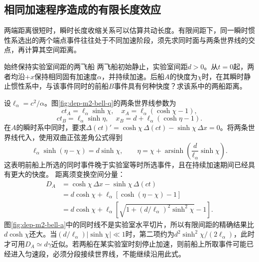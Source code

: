 \subsection{相同加速程序造成的有限长度效应}
两端距离很短时，瞬时长度收缩关系可以估算共动长度。有限间距下，同一瞬时惯性系选出的两个端点事件往往处于不同加速阶段，须先求同时面与两条世界线的交点，再计算其空间距离。

\begin{example}始终保持实验室间距的两飞船
两飞船初始静止，实验室间距$d>0$。从$t=0$起，两者均沿$+x$保持相同固有加速度$\alpha$，并持续加速。后船$A$的快度为$\chi$时，在其瞬时静止惯性系中，与该事件同时的前船$B$事件具有何种快度？求该系中的两船距离。
\end{example}
\begin{solution}
设$\ell_\alpha=c^2/\alpha$。图\ref{fig:dep-m2-bell-q}的两条世界线参数为
\[
 ct_A=\ell_\alpha\sinh\chi,\quad
 x_A=\ell_\alpha(\cosh\chi-1),
\]
\[
 ct_B=\ell_\alpha\sinh\eta,\quad
 x_B=d+\ell_\alpha(\cosh\eta-1).
\]
在$A$的瞬时系中同时，要求$\Delta(ct)'=\cosh\chi\,\Delta(ct)-\sinh\chi\,\Delta x=0$。将两条世界线代入，使用双曲正弦差角公式得到
\[
 \ell_\alpha\sinh(\eta-\chi)=d\sinh\chi,
 \qquad \eta=\chi+\operatorname{arsinh}
 \left(\frac d{\ell_\alpha}\sinh\chi\right).
\]
这表明前船上所选的同时事件晚于实验室等时所选事件，且在持续加速期间已经具有更大的快度。
距离须变换空间分量：
\begin{align*}
 D_A&=\cosh\chi\,\Delta x-\sinh\chi\,\Delta(ct)\\
 &=d\cosh\chi+\ell_\alpha[\cosh(\eta-\chi)-1]\\
 &=d\cosh\chi+\ell_\alpha\left[
 \sqrt{1+(d/\ell_\alpha)^2\sinh^2\chi}-1\right].
\end{align*}
图\ref{fig:dep-m2-bell-a}中的同时线不是实验室水平切片，所以有限间距的精确结果比$d\cosh\chi$还大。当$(d/\ell_\alpha)|\sinh\chi|\ll1$时，第二项约为$d^2\sinh^2\chi/(2\ell_\alpha)$，此时才可用$D_A\simeq d\gamma$近似。若两船在某实验室时刻停止加速，则前船上所取事件可能已经进入匀速段，必须分段接续世界线，不能继续沿用此式。
\end{solution}
